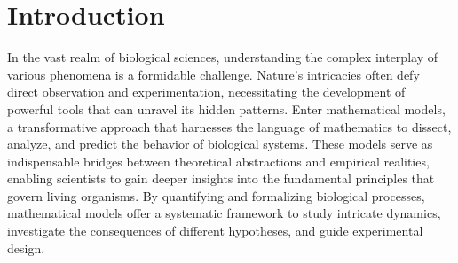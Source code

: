 
\chapter{Introduction}\label{ch:introduction}
In the vast realm of biological sciences, understanding the complex interplay of various phenomena is a formidable challenge. Nature's intricacies often defy direct observation and experimentation, necessitating the development of powerful tools that can unravel its hidden patterns. Enter mathematical models, a transformative approach that harnesses the language of mathematics to dissect, analyze, and predict the behavior of biological systems. These models serve as indispensable bridges between theoretical abstractions and empirical realities, enabling scientists to gain deeper insights into the fundamental principles that govern living organisms. By quantifying and formalizing biological processes, mathematical models offer a systematic framework to study intricate dynamics, investigate the consequences of different hypotheses, and guide experimental design. %

